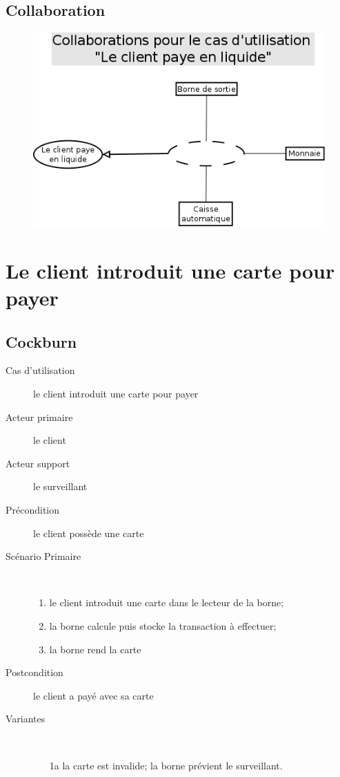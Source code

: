 \documentclass[a4paper]{article}
\begin{document}
\subsection{Collaboration}
\begin{figure}[!ht]
\centering
\includegraphics[scale=.5]{collaborations/_liquide.png}
\end{figure}

\newpage

\section{Le client introduit une carte pour payer}
\subsection{Cockburn}
\begin{description}
	\item[Cas d'utilisation] le client introduit une carte pour payer
	\item[Acteur primaire] le client
	\item[Acteur support] le surveillant
	\item[Pr\'econdition] le client poss\`ede une carte
	\item[Sc\'enario Primaire] \
	\begin{enumerate}
		\item le client introduit une carte dans le lecteur de la borne;
		\item la borne calcule puis stocke la transaction \`a effectuer;
		\item la borne rend la carte
	\end{enumerate}
	\item[Postcondition] le client a pay\'e avec sa carte
	\item[Variantes] \
	\begin{enumerate}
		\item[1a] la carte est invalide; la borne pr\'evient le surveillant.
	\end{enumerate}
\end{description}
\end{document}
